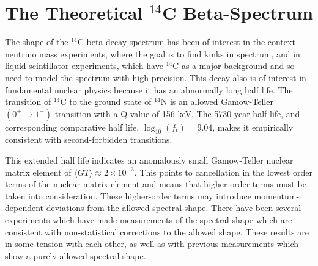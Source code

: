 \section{The Theoretical $^{14}$C Beta-Spectrum}\label{sec:c14spec}
The shape of the $^{14}$C beta decay spectrum has been of interest in the context neutrino mass experiments\cite{C14_Wietfeldt}, where the goal is to find kinks in spectrum, and in liquid scintillator experiments, which have $^{14}$C as a major background and so need to model the spectrum with high precision\cite{C14_Borexino, C14_Bergeron}. This  decay also is of interest in fundamental nuclear physics because it has an abnormally long half life\cite{C14_Kuzminov,C14_Genz,C14_Garcia}. The transition of $^{14}$C to the ground state of $^{14}$N is an allowed Gamow-Teller $(0^+ \rightarrow 1^+)$ transition with a Q-value of 156 keV. The 5730 year half-life, and corresponding comparative half life, $\log_{10}(f_t)=9.04$, makes it empirically consistent with second-forbidden transitions\cite{C14_Kuzminov,C14_Wietfeldt}.

This extended half life indicates an anomalously small Gamow-Teller nuclear matrix element of $\langle GT \rangle \approx 2 \times 10^{-3}$. This points to cancellation in the lowest order terms of the nuclear matrix element and means that higher order terms must be taken into consideration. These higher-order terms may introduce momentum-dependent deviations from the allowed spectral shape. There have been several experiments\cite{C14_Sonntag, C14_Wietfeldt, C14_Borexino, C14_Kuzminov, C14_Bergeron} which have made measurements of the spectral shape which are consistent with non-statistical corrections to the allowed shape. These results are in some tension with each other, as well as with previous measurements which show a purely allowed spectral shape\cite{C14_Curran}. 

